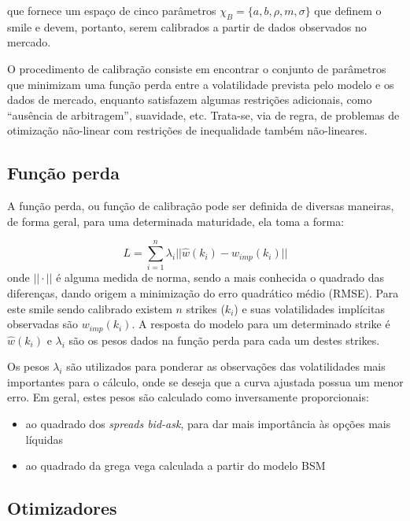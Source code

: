 \documentclass[]{book}
\providecommand{\tightlist}{%
  \setlength{\itemsep}{0pt}\setlength{\parskip}{0pt}}
\theoremstyle{definition}
\theoremstyle{definition}
\theoremstyle{definition}
\theoremstyle{remark}
\begin{document}
que fornece um espaço de cinco parâmetros \(\chi_B=\{a, b, \rho, m, \sigma\}\) que definem o smile e devem, portanto, serem calibrados a partir de dados observados no mercado.

O procedimento de calibração consiste em encontrar o conjunto de parâmetros que minimizam uma função perda entre a volatilidade prevista pelo modelo e os dados de mercado, enquanto satisfazem algumas restrições adicionais, como ``ausência de arbitragem'', suavidade, etc. Trata-se, via de regra, de problemas de otimização não-linear com restrições de inequalidade também não-lineares.

\hypertarget{funcao-perda}{%
\subsection{Função perda}\label{funcao-perda}}

A função perda, ou função de calibração pode ser definida de diversas maneiras, de forma geral, para uma determinada maturidade, ela toma a forma:

\[L=\sum\limits_{i=1}^n\lambda_i||\hat w(k_i)-w_{imp}(k_i)||\]
onde \(||\cdot||\) é alguma medida de norma, sendo a mais conhecida o quadrado das diferenças, dando origem a minimização do erro quadrático médio (RMSE). Para este smile sendo calibrado existem \(n\) strikes (\(k_i\)) e suas volatilidades implícitas observadas são \(w_{imp}(k_i)\). A resposta do modelo para um determinado strike é \(\hat w(k_i)\) e \(\lambda_i\) são os pesos dados na função perda para cada um destes strikes.

Os pesos \(\lambda_i\) são utilizados para ponderar as observações das volatilidades mais importantes para o cálculo, onde se deseja que a curva ajustada possua um menor erro. Em geral, estes pesos são calculado como inversamente proporcionais:

\begin{itemize}
\tightlist
\item
  ao quadrado dos \emph{spreads bid-ask}, para dar mais importância às opções mais líquidas
\item
  ao quadrado da grega vega calculada a partir do modelo BSM
\end{itemize}

\hypertarget{otimizadores}{%
\subsection{Otimizadores}\label{otimizadores}}
\end{document}
